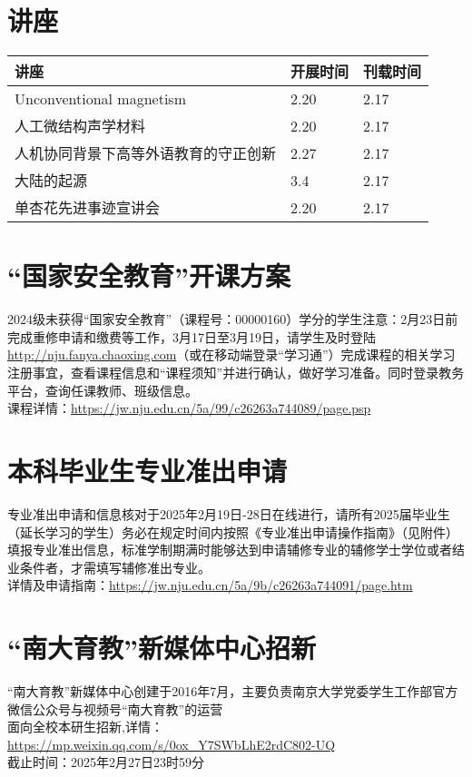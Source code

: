 \documentclass[letterpaper, 12pt]{article}
\begin{document}
\begin{multicols}{2}

\section{讲座}
\begin{tabularx}{0.5\textwidth}{|X|X|X|}
    \hline
    讲座 & 开展时间 & 刊载时间\\
    \hline\hline
Unconventional magnetism & 2.20 & 2.17\\\hline
人工微结构声学材料 & 2.20 & 2.17\\\hline
人机协同背景下高等外语教育的守正创新 & 2.27 & 2.17\\\hline
大陆的起源 & 3.4 & 2.17\\\hline
单杏花先进事迹宣讲会 & 2.20 & 2.17\\\hline
\end{tabularx}

\section{“国家安全教育”开课方案}
2024级未获得“国家安全教育”（课程号：00000160）学分的学生注意：2月23日前完成重修申请和缴费等工作，3月17日至3月19日，请学生及时登陆\url{http://nju.fanya.chaoxing.com}（或在移动端登录“学习通”）完成课程的相关学习注册事宜，查看课程信息和“课程须知”并进行确认，做好学习准备。同时登录教务平台，查询任课教师、班级信息。\\
课程详情：\url{https://jw.nju.edu.cn/5a/99/c26263a744089/page.psp}\\
\section{本科毕业生专业准出申请}
专业准出申请和信息核对于2025年2月19日-28日在线进行，请所有2025届毕业生（延长学习的学生）务必在规定时间内按照《专业准出申请操作指南》（见附件）填报专业准出信息，标准学制期满时能够达到申请辅修专业的辅修学士学位或者结业条件者，才需填写辅修准出专业。\\
详情及申请指南：\url{https://jw.nju.edu.cn/5a/9b/c26263a744091/page.htm}\\
\section{“南大育教”新媒体中心招新}
“南大育教”新媒体中心创建于2016年7月，主要负责南京大学党委学生工作部官方微信公众号与视频号“南大育教”的运营\\
面向全校本研生招新,详情：\url{https://mp.weixin.qq.com/s/0ox_Y7SWbLhE2rdC802-UQ}\\
截止时间：2025年2月27日23时59分

\end{multicols}
\end{document}
